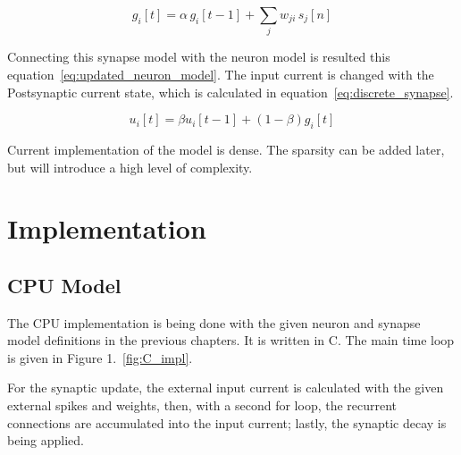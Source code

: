 \documentclass[11pt,a4paper]{article}
\begin{document}
\begin{equation}
g_i[t] = \alpha\, g_i[t-1] + \sum_j w_{ji}\, s_j[n]
\label{eq:discrete_synapse}
\end{equation}

Connecting this synapse model with the neuron model is 
resulted this equation~\ref{eq:updated_neuron_model}.
The input current is changed with the Postsynaptic current state, 
which is calculated in equation~\ref{eq:discrete_synapse}.

\begin{equation}
u_i[t] = \beta u_i[t-1] + (1 - \beta) g_i[t] 
\label{eq:updated_neuron_model}
\end{equation}


Current implementation of the model is dense. 
The sparsity can be added later, but will introduce a high level of complexity.









\section{Implementation}
\subsection{CPU Model}
The CPU implementation is being done with the given neuron and synapse model definitions
in the previous chapters. It is written in C. The main time loop is given in Figure 1.~\ref{fig:C_impl}. 
  
  For the synaptic update, the external input current is calculated with the given external spikes and weights, then, with a second for loop, 
  the recurrent connections are accumulated into the input current; lastly, the synaptic decay is being applied.
  
\end{document}
